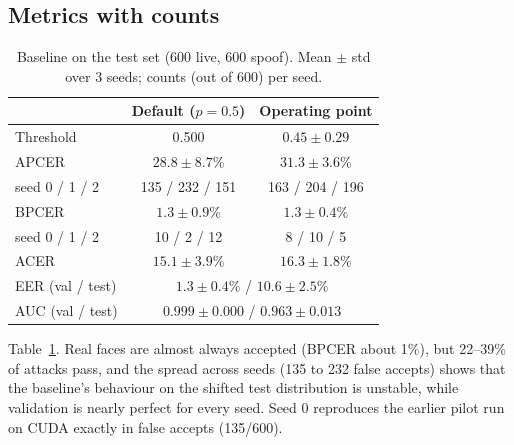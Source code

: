 \documentclass[conference]{IEEEtran}
\begin{document}
\subsection{Metrics with counts}
\begin{table}[t]\centering\small
\caption{Baseline on the test set (600 live, 600 spoof). Mean $\pm$ std over 3 seeds; counts (out of 600) per seed.}
\label{tab:base}
\begin{tabular}{lcc}\toprule
 & Default ($p{=}0.5$) & Operating point \\\midrule
Threshold & 0.500 & $0.45\pm0.29$ \\
APCER & $28.8\pm8.7$\% & $31.3\pm3.6$\% \\
\quad seed 0 / 1 / 2 & 135 / 232 / 151 & 163 / 204 / 196 \\
BPCER & $1.3\pm0.9$\% & $1.3\pm0.4$\% \\
\quad seed 0 / 1 / 2 & 10 / 2 / 12 & 8 / 10 / 5 \\
ACER & $15.1\pm3.9$\% & $16.3\pm1.8$\% \\
EER (val / test) & \multicolumn{2}{c}{$1.3\pm0.4$\% / $10.6\pm2.5$\%} \\
AUC (val / test) & \multicolumn{2}{c}{$0.999\pm0.000$ / $0.963\pm0.013$} \\\bottomrule
\end{tabular}
\end{table}
Table~\ref{tab:base}. Real faces are almost always accepted (BPCER about 1\%), but 22--39\% of attacks pass,
and the spread across seeds (135 to 232 false accepts) shows that the baseline's behaviour on the shifted test
distribution is unstable, while validation is nearly perfect for every seed. Seed 0 reproduces the earlier
pilot run on CUDA exactly in false accepts (135/600).
\end{document}
